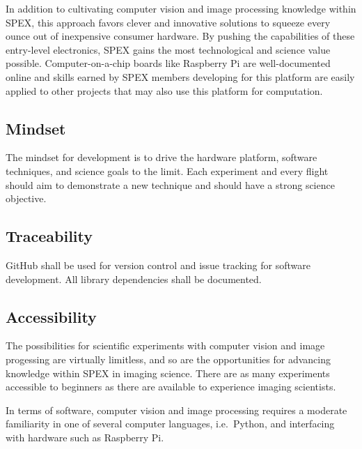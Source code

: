 \documentclass[conference]{IEEEtran} %
\begin{document}
In addition to cultivating computer vision and image processing knowledge within SPEX, this approach favors clever and innovative solutions to squeeze every ounce out of inexpensive consumer hardware.
By pushing the capabilities of these entry-level electronics, SPEX gains the most technological and science value possible.
Computer-on-a-chip boards like Raspberry Pi are well-documented online and skills earned by SPEX members developing for this platform are easily applied to other projects that may also use this platform for computation.

\subsection{Mindset}
\label{subsec:mindset}

The mindset for development is to drive the hardware platform, software techniques, and science goals to the limit.
Each experiment and every flight should aim to demonstrate a new technique and should have a strong science objective.

\subsection{Traceability}
\label{subsec:traceability}

GitHub shall be used for version control and issue tracking for software development.
All library dependencies shall be documented.

\subsection{Accessibility}
\label{subsec:accessibility}

The possibilities for scientific experiments with computer vision and image progessing are virtually limitless, and so are the opportunities for advancing knowledge within SPEX in imaging science.
There are as many experiments accessible to beginners as there are available to experience imaging scientists.

In terms of software, computer vision and image processing requires a moderate familiarity in one of several computer languages, i.e.~Python, and interfacing with hardware such as Raspberry Pi.
\end{document}

